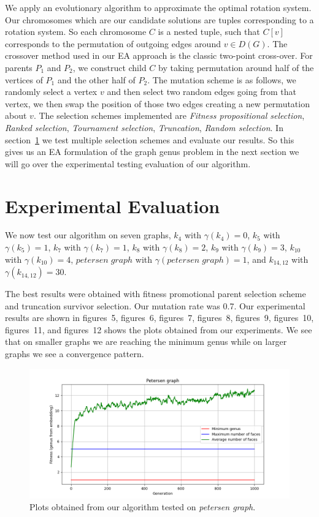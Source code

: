 \documentclass{article}
\begin{document}
We apply an evolutionary algorithm to approximate the optimal rotation system. 
Our chromosomes which are our candidate solutions are tuples corresponding to a rotation system. So each chromosome $C$ is a nested tuple, such that $C[v]$ corresponds to the permutation of outgoing edges around $v \in D(G)$.
The crossover method used in our EA approach is the classic two-point cross-over. For parents $P_1$ and $P_2$, we construct child $C$ by taking permutation around half of the vertices of $P_1$ and the other half of $P_2$.
The mutation scheme is as follows, we randomly select a vertex $v$ and then select two random edges going from that vertex, we then swap the position of those two edges creating a new permutation about $v$.
The selection schemes implemented are \emph{Fitness propositional selection}, \emph{Ranked selection}, \emph{Tournament selection}, \emph{Truncation}, \emph{Random selection}. In section~\ref{sec: exp} we test multiple selection schemes and evaluate our results.
So this gives us an EA formulation of the graph genus problem in the next section we will go over the experimental testing evaluation of our algorithm.

\section{Experimental Evaluation}\label{sec: exp}

We now test our algorithm on seven graphs, $k_4$ with $\gamma(k_4) = 0$, $k_5$ with $\gamma(k_5) = 1$, $k_7$ with $\gamma(k_7) = 1$, 
$k_8$ with $\gamma(k_8) = 2$, $k_9$ with $\gamma(k_9) = 3$, $k_{10}$ with $\gamma(k_{10}) = 4$,  $petersen\;graph$ with $\gamma(petersen\;graph) = 1$,
and $k_{14,12}$ with $\gamma(k_{14,12}) = 30$.

The best results were obtained with fitness promotional parent selection scheme and truncation survivor selection. Our mutation rate was 0.7.
Our experimental results are shown in figures~5, figures~6, figures~7, figures~8, figures~9, figures~10, figures~11, and figures~12 shows the plots obtained from our experiments. 
We see that on smaller graphs we are reaching the minimum genus while on larger graphs we see a convergence pattern.


\begin{figure}[!tbh]
    \centering
    \label{tests1}
    \includegraphics[scale = 0.5]{petersen.png}
    \caption{Plots obtained from our algorithm tested on \emph{petersen graph}.}
\end{figure}
\end{document}
